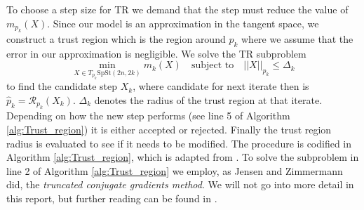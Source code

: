 To choose a step size for TR we demand that the step must reduce the value of $m_{p_{k}}(X)$. Since our model is an approximation in the tangent space, we construct a trust region which is the region around $p_{k}$ where we assume that the error in our approximation is negligible. We solve the TR subproblem
%
\begin{equation}\label{eq:TR_subproblem}
\operatorname*{min}_{X\in T_{p_{k}}\mathrm{SpSt}(2n, 2k)}m_{k}(X)\quad \text{subject to}\quad \lvert \lvert X \rvert  \rvert _{p_{k}}\leq \Delta_{k}
\end{equation}
%
to find the candidate step $X_{k}$,  where candidate for next iterate then is $\hat{p}_{k}=\mathcal{R}_{p_{k}}(X_{k})$. $\Delta_{k}$ denotes the radius of the trust region at that iterate. Depending on how the new step performs (see line 5 of Algorithm \ref{alg:Trust_region}) it is either accepted or rejected. Finally the trust region radius is evaluated to see if it needs to be modified. The procedure is codified in Algorithm \ref{alg:Trust_region}, which is adapted from \cite[Algorithm 3.3]{Boumal2023}. To solve the subproblem in line 2 of Algorithm \ref{alg:Trust_region} we employ, as Jensen and Zimmermann did, the \textit{truncated conjugate gradients method}. We will not go into more detail in this report, but further reading can be found in \cite[p.~131]{Boumal2023}.

